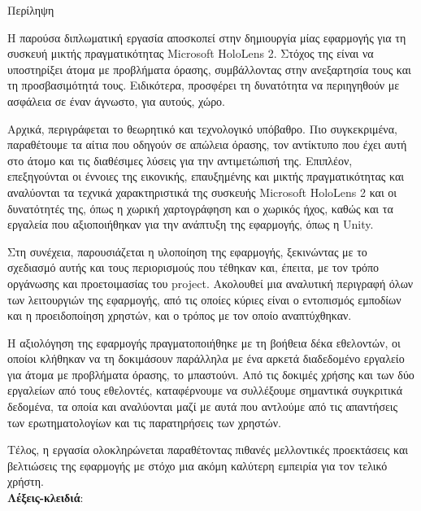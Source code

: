 \pagestyle{plain}
\begin{center}
{\LARGE Περίληψη}\\[1cm]
\end{center}

\setlength{\parindent}{0pt}
Η παρούσα διπλωματική εργασία αποσκοπεί στην δημιουργία μίας εφαρμογής για τη συσκευή μικτής πραγματικότητας Microsoft HoloLens 2. Στόχος της είναι να υποστηρίξει άτομα με προβλήματα όρασης, συμβάλλοντας στην ανεξαρτησία τους και τη προσβασιμότητά τους. Ειδικότερα, προσφέρει τη δυνατότητα να περιηγηθούν με ασφάλεια σε έναν άγνωστο, για αυτούς, χώρο.

Αρχικά, περιγράφεται το θεωρητικό και τεχνολογικό υπόβαθρο. Πιο συγκεκριμένα, παραθέτουμε τα αίτια που οδηγούν σε απώλεια όρασης, τον αντίκτυπο που έχει αυτή στο άτομο και τις διαθέσιμες λύσεις για την αντιμετώπισή της. Επιπλέον, επεξηγούνται οι έννοιες της εικονικής, επαυξημένης και μικτής πραγματικότητας και αναλύονται τα τεχνικά χαρακτηριστικά της συσκευής Microsoft HoloLens 2 και οι δυνατότητές της, όπως η χωρική χαρτογράφηση και ο χωρικός ήχος, καθώς και τα εργαλεία που αξιοποιήθηκαν για την ανάπτυξη της εφαρμογής, όπως η Unity.

Στη συνέχεια, παρουσιάζεται η υλοποίηση της εφαρμογής, ξεκινώντας με το σχεδιασμό αυτής και τους περιορισμούς που τέθηκαν και, έπειτα, με τον τρόπο οργάνωσης και προετοιμασίας του project. Ακολουθεί μια αναλυτική περιγραφή όλων των λειτουργιών της εφαρμογής, από τις οποίες κύριες είναι ο εντοπισμός εμποδίων και η προειδοποίηση χρηστών, και ο τρόπος με τον οποίο αναπτύχθηκαν.

Η αξιολόγηση της εφαρμογής πραγματοποιήθηκε με τη βοήθεια δέκα εθελοντών, οι οποίοι κλήθηκαν να τη δοκιμάσουν παράλληλα με ένα αρκετά διαδεδομένο εργαλείο για άτομα με προβλήματα όρασης, το μπαστούνι. Από τις δοκιμές χρήσης και των δύο εργαλείων από τους εθελοντές, καταφέρνουμε να συλλέξουμε σημαντικά συγκριτικά δεδομένα, τα οποία και αναλύονται μαζί με αυτά που αντλούμε από τις απαντήσεις των ερωτηματολογίων και τις παρατηρήσεις των χρηστών.

Τέλος, η εργασία ολοκληρώνεται παραθέτοντας πιθανές μελλοντικές προεκτάσεις και βελτιώσεις της εφαρμογής με στόχο μια ακόμη καλύτερη εμπειρία για τον τελικό χρήστη.
\\[\baselineskip]
\textbf{Λέξεις-κλειδιά}: {\keywords}